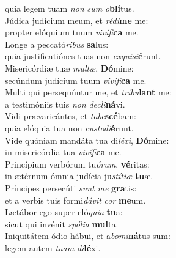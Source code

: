 \oddverse quia legem tuam \textit{non} \textit{sum} \textit{o}\textbf{blí}tus.\\
\evenverse Júdica judícium meum, et \textit{ré}\textit{di}\textbf{me} me:~\*\\
\evenverse propter elóquium tuum \textit{vi}\textit{ví}\textit{fi}\textbf{ca} me.\\
\oddverse Longe a peccató\textit{ri}\textit{bus} \textbf{sa}lus:~\*\\
\oddverse quia justificatiónes tuas non \textit{ex}\textit{qui}\textit{si}\textbf{é}runt.\\
\evenverse Misericórdiæ tuæ \textit{mul}\textit{tæ}, \textbf{Dó}mine:~\*\\
\evenverse secúndum judícium tuum \textit{vi}\textit{ví}\textit{fi}\textbf{ca} me.\\
\oddverse Multi qui persequúntur me, et \textit{trí}\textit{bu}\textbf{lant} me:~\*\\
\oddverse a testimóniis tuis \textit{non} \textit{de}\textit{cli}\textbf{ná}vi.\\
\evenverse Vidi prævaricántes, et \textit{ta}\textit{be}\textbf{scé}bam:~\*\\
\evenverse quia elóquia tua non \textit{cu}\textit{sto}\textit{di}\textbf{é}runt.\\
\oddverse Vide quóniam mandáta tua di\textit{lé}\textit{xi}, \textbf{Dó}mine:~\*\\
\oddverse in misericórdia tua \textit{vi}\textit{ví}\textit{fi}\textbf{ca} me.\\
\evenverse Princípium verbórum tu\textit{ó}\textit{rum}, \textbf{vé}ritas:~\*\\
\evenverse in ætérnum ómnia judícia ju\textit{stí}\textit{ti}\textit{æ} \textbf{tu}æ.\\
\oddverse Príncipes persecúti \textit{sunt} \textit{me} \textbf{gra}tis:~\*\\
\oddverse et a verbis tuis formi\textit{dá}\textit{vit} \textit{cor} \textbf{me}um.\\
\evenverse Lætábor ego super eló\textit{qui}\textit{a} \textbf{tu}a:~\*\\
\evenverse sicut qui invénit \textit{spó}\textit{li}\textit{a} \textbf{mul}ta.\\
\oddverse Iniquitátem ódio hábui, et a\textit{bo}\textit{mi}\textbf{ná}tus sum:~\*\\
\oddverse legem autem \textit{tu}\textit{am} \textit{di}\textbf{lé}xi.\\

